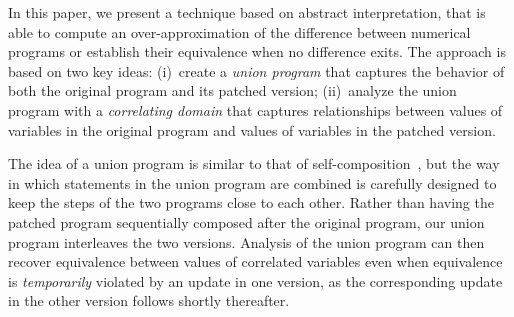 



In this paper, we present a technique based on abstract interpretation, that
is able to compute an over-approximation of the difference between numerical
programs or establish their equivalence when no difference exits. The
approach is based on two key ideas: (i)~create a \emph{union program} that
captures the behavior of both the original program and its patched version;
(ii)~analyze the union program with a \emph{correlating domain} that captures
relationships between values of variables in the original program and values
of variables in the patched version.

The idea of a union program is similar to that of
self-composition~\cite{BartheDArgenioRezk04,AikenTerauchi05}, but the way in
which statements in the union program are combined is carefully designed to
keep the steps of the two programs close to each other. Rather than having
the patched program sequentially composed after the original program, our
union program interleaves the two versions. Analysis of the union program can
then recover equivalence between values of correlated variables even when
equivalence is \emph{temporarily} violated by an update in one version, as
the corresponding update in the other version follows shortly thereafter.




